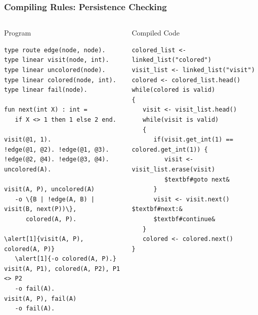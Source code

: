 \documentclass{beamer}
\let\oldalert\alert
\renewcommand{\alert}[2][]{%
  \if\relax\detokenize{#1}\relax%
    \oldalert{#2}%
  \else
    \oldalert<#1>{#2}%
  \fi}
\begin{document}
\begin{frame}[fragile]
   \frametitle{Compiling Rules: Persistence Checking}
   \begin{columns}[t]
     \begin{block}{Program}
       \begin{Verbatim}[fontsize=\tiny,commandchars=\\\{\},frame=single]
type route edge(node, node).
type linear visit(node, int).
type linear uncolored(node).
type linear colored(node, int).
type linear fail(node).

fun next(int X) : int =
   if X <> 1 then 1 else 2 end.

visit(@1, 1).
!edge(@1, @2). !edge(@1, @3).
!edge(@2, @4). !edge(@3, @4).
uncolored(A).

visit(A, P), uncolored(A)
   -o \{B | !edge(A, B) | visit(B, next(P))\},
      colored(A, P).

\alert[1]{visit(A, P), colored(A, P)}
   \alert[1]{-o colored(A, P).}
visit(A, P1), colored(A, P2), P1 <> P2
   -o fail(A).
visit(A, P), fail(A)
   -o fail(A).
\end{Verbatim}
     \end{block}
   \begin{block}{Compiled Code}
\begin{Verbatim}[fontsize=\tiny,frame=single,commandchars=\$\#\&]
colored_list <- linked_list("colored")
visit_list <- linked_list("visit")
colored <- colored_list.head()
while(colored is valid)
{
   visit <- visit_list.head()
   while(visit is valid)
   {
      if(visit.get_int(1) == colored.get_int(1)) {
         visit <- visit_list.erase(visit)
         $textbf#goto next&
      }
      visit <- visit.next()
$textbf#next:&
      $textbf#continue&
   }
   colored <- colored.next()
}
\end{Verbatim}
   \end{block}
   \end{columns}
\end{frame}
\end{document}
